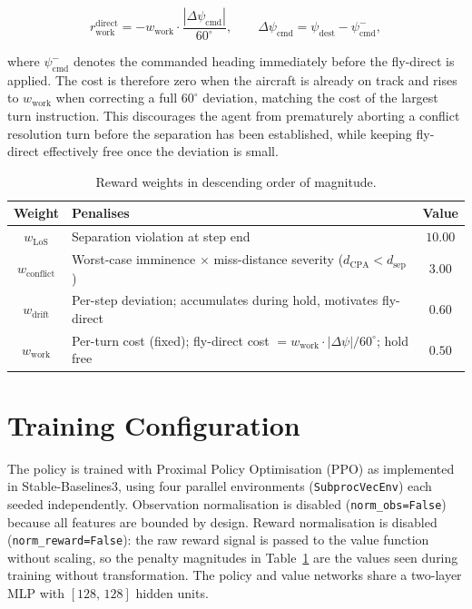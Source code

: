 \documentclass[11pt, a4paper]{article}
\begin{document}
\begin{equation}
    r_\text{work}^\text{direct}
    = -w_\text{work} \cdot \frac{|\Delta\psi_\text{cmd}|}{60^\circ},
    \qquad
    \Delta\psi_\text{cmd} = \psi_\text{dest} - \psi_\text{cmd}^{-},
\end{equation}

where $\psi_\text{cmd}^{-}$ denotes the commanded heading immediately before
the fly-direct is applied.
The cost is therefore zero when the aircraft is already on track and rises
to $w_\text{work}$ when correcting a full $60^\circ$ deviation, matching
the cost of the largest turn instruction.
This discourages the agent from prematurely aborting a conflict resolution
turn before the separation has been established, while keeping fly-direct
effectively free once the deviation is small.

\begin{table}[h]
\centering
\caption{Reward weights in descending order of magnitude.}
\label{tab:weights}
\smallskip
\begin{tabular}{clc}
\toprule
\textbf{Weight} & \textbf{Penalises} & \textbf{Value} \\
\midrule
$w_\text{LoS}$      & Separation violation at step end                                        & $10.00$ \\
$w_\text{conflict}$ & Worst-case imminence $\times$ miss-distance severity ($d_\text{CPA} < d_\text{sep}$) & $3.00$ \\
$w_\text{drift}$    & Per-step deviation; accumulates during hold, motivates fly-direct        & $0.60$ \\
$w_\text{work}$     & Per-turn cost (fixed); fly-direct cost $= w_\text{work}\cdot|\Delta\psi|/60^\circ$; hold free & $0.50$ \\
\bottomrule
\end{tabular}
\end{table}

\section{Training Configuration}
\label{sec:training}

The policy is trained with Proximal Policy Optimisation (PPO) as implemented
in Stable-Baselines3, using four parallel environments (\texttt{SubprocVecEnv})
each seeded independently.
Observation normalisation is disabled (\texttt{norm\_obs=False}) because all
features are bounded by design.
Reward normalisation is disabled (\texttt{norm\_reward=False}): the raw
reward signal is passed to the value function without scaling, so the
penalty magnitudes in Table~\ref{tab:weights} are the values seen during
training without transformation.
The policy and value networks share a two-layer MLP with $[128,\,128]$ hidden
units.
\end{document}

